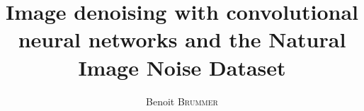\documentclass{EPL-master-thesis-covers-EN}
\title{Image denoising with convolutional neural networks and the Natural Image Noise Dataset}
\author{Benoit \textsc{Brummer}}
\begin{document}
  \maketitle

  \backcoverpage
\end{document}
